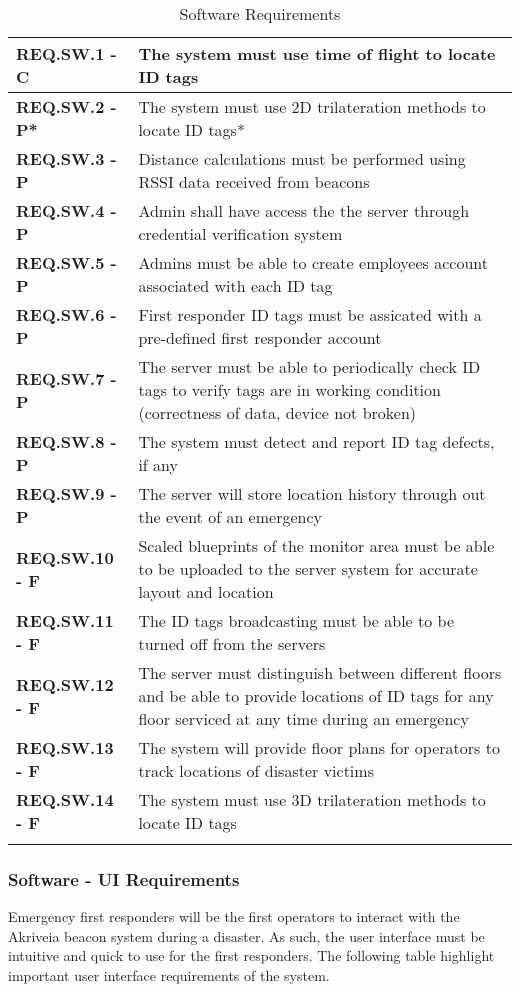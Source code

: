\bigskip

\bgroup
\def\arraystretch{1.5}
\begin{longtable}[H]{ | m{3.5cm} | m{12.5cm} |}
 \hline
 \textbf{REQ.SW.1 - C} & The system must use time of flight to locate ID tags \\
\hline
 \textbf{REQ.SW.2 - P*} & The system must use 2D trilateration methods to locate ID tags* \\
\hline
 \textbf{REQ.SW.3 - P} & Distance calculations must be performed using RSSI data received from beacons \\
\hline
 \textbf{REQ.SW.4 - P} & Admin shall have access the the server through credential verification system \\
\hline
 \textbf{REQ.SW.5 - P} & Admins must be able to create employees account associated with each ID tag \\
\hline
 \textbf{REQ.SW.6 - P} & First responder ID tags must be assicated with a pre-defined first responder account \\
\hline
 \textbf{REQ.SW.7 - P} & The server must be able to periodically check ID tags to verify tags are in working condition (correctness of data, device not broken) \\
\hline
 \textbf{REQ.SW.8 - P} & The system must detect and report ID tag defects, if any \\
\hline
 \textbf{REQ.SW.9 - P} & The server will store location history through out the event of an emergency \\
\hline
 \textbf{REQ.SW.10 - F} & Scaled blueprints of the monitor area must be able to be uploaded to the server system for accurate layout and location \\
\hline
 \textbf{REQ.SW.11 - F} & The ID tags broadcasting must be able to be turned off from the servers \\
\hline
 \textbf{REQ.SW.12 - F} & The server must distinguish between different floors and be able to provide locations of ID tags for any floor serviced at any time during an emergency \\
\hline
 \textbf{REQ.SW.13 - F} & The system will provide floor plans for operators to track locations of disaster victims \\
\hline
 \textbf{REQ.SW.14 - F} & The system must use 3D trilateration methods to locate ID tags \\
\hline
\caption{Software Requirements}
\end{longtable}

\break
\subsubsection{Software - UI Requirements}
Emergency first responders will be the first operators to interact with the Akriveia beacon system during a disaster. As such, the user interface must be intuitive and quick to use for the first responders. The following table highlight important user interface requirements of the system.
\bigskip

